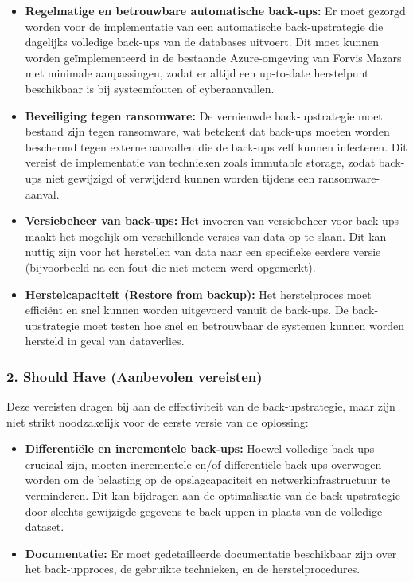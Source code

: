 \begin{itemize}
    \item \textbf{Regelmatige en betrouwbare automatische back-ups:} Er moet gezorgd worden voor de implementatie van een automatische back-upstrategie die dagelijks volledige back-ups van de databases uitvoert. Dit moet kunnen worden geïmplementeerd in de bestaande Azure-omgeving van Forvis Mazars met minimale aanpassingen, zodat er altijd een up-to-date herstelpunt beschikbaar is bij systeemfouten of cyberaanvallen.
    
    \item \textbf{Beveiliging tegen ransomware:} De vernieuwde back-upstrategie moet bestand zijn tegen ransomware, wat betekent dat back-ups moeten worden beschermd tegen externe aanvallen die de back-ups zelf kunnen infecteren. Dit vereist de implementatie van technieken zoals immutable storage, zodat back-ups niet gewijzigd of verwijderd kunnen worden tijdens een ransomware-aanval.
    
    \item \textbf{Versiebeheer van back-ups:} Het invoeren van versiebeheer voor back-ups maakt het mogelijk om verschillende versies van data op te slaan. Dit kan nuttig zijn voor het herstellen van data naar een specifieke eerdere versie (bijvoorbeeld na een fout die niet meteen werd opgemerkt).
    
    \item \textbf{Herstelcapaciteit (Restore from backup):} Het herstelproces moet efficiënt en snel kunnen worden uitgevoerd vanuit de back-ups. De back-upstrategie moet testen hoe snel en betrouwbaar de systemen kunnen worden hersteld in geval van dataverlies.
\end{itemize}

\subsubsection{2. Should Have (Aanbevolen vereisten)}
Deze vereisten dragen bij aan de effectiviteit van de back-upstrategie, maar zijn niet strikt noodzakelijk voor de eerste versie van de oplossing:

\begin{itemize}
    \item \textbf{Differentiële en incrementele back-ups:} Hoewel volledige back-ups cruciaal zijn, moeten incrementele en/of differentiële back-ups overwogen worden om de belasting op de opslagcapaciteit en netwerkinfrastructuur te verminderen. Dit kan bijdragen aan de optimalisatie van de back-upstrategie door slechts gewijzigde gegevens te back-uppen in plaats van de volledige dataset.
    
    \item \textbf{Documentatie:} Er moet gedetailleerde documentatie beschikbaar zijn over het back-upproces, de gebruikte technieken, en de herstelprocedures.
    
\end{itemize}

